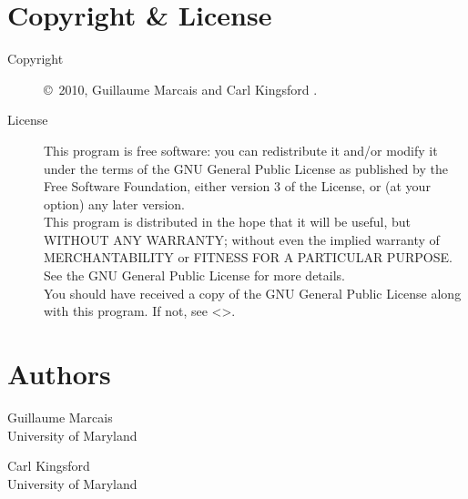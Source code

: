 \documentclass[english]{article}
\begin{document}
\section{Copyright \& License}
\begin{description}
\item[Copyright] \copyright\ 2010, Guillaume Marcais  and Carl Kingsford .

\item[License] This program is free software: you can redistribute it
  and/or modify it under the terms of the GNU General Public License
  as published by the Free Software Foundation, either version 3 of
  the License, or (at your option) any later version. \\
  This program is distributed in the hope that it will be useful, but
  WITHOUT ANY WARRANTY; without even the implied warranty of
  MERCHANTABILITY or FITNESS FOR A PARTICULAR PURPOSE.  See the GNU
  General Public License for more details. \\
  You should have received a copy of the GNU General Public License
  along with this program.  If not, see
  <>.
\end{description}

\section{Authors}
\noindent
Guillaume Marcais \\
University of Maryland \\

Carl Kingsford \\
University of Maryland \\

\LatexManEnd
\end{document}
